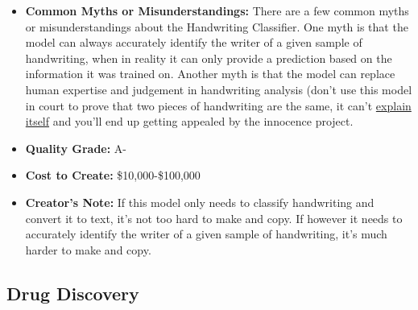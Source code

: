 \begin{itemize}
    \item \textbf{Common Myths or Misunderstandings:} There are a few common myths or misunderstandings about the Handwriting Classifier. One myth is that the model can always accurately identify the writer of a given sample of handwriting, when in reality it can only provide a prediction based on the information it was trained on. Another myth is that the model can replace human expertise and judgement in handwriting analysis (don't use this model in court to prove that two pieces of handwriting are the same, it can't \hyperref[sec:explain]{explain itself} and you'll end up getting appealed by the innocence project.
    \item \textbf{Quality Grade:} A-
    \item \textbf{Cost to Create:} \$10,000-\$100,000
    \item \textbf{Creator's Note:} If this model only needs to classify handwriting and convert it to text, it's not too hard to make and copy. If however it needs to accurately identify the writer of a given sample of handwriting, it's much harder to make and copy.
\end{itemize}

\subsection{Drug Discovery}


